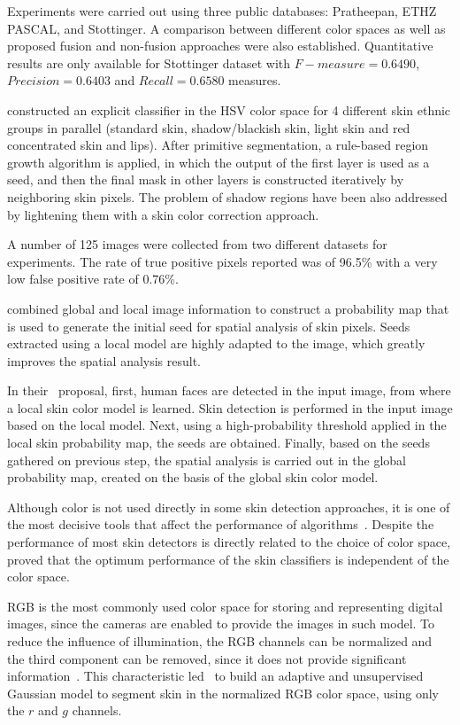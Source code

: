 Experiments were carried out using three public databases: Pratheepan, ETHZ PASCAL, and Stottinger. A comparison between different color spaces as well as proposed fusion and non-fusion approaches were also established. Quantitative results are only available for Stottinger dataset with $F-measure = 0.6490$, $Precision = 0.6403$ and $Recall = 0.6580$ measures.

\citet{naji:12} constructed an explicit classifier in the HSV color space for 4 different skin ethnic groups in parallel (standard skin, shadow/blackish skin, light skin and red concentrated skin and lips). After primitive segmentation, a rule-based region growth algorithm is applied, in which the output of the first layer is used as a seed, and then the final mask in other layers is constructed iteratively by neighboring skin pixels. The problem of shadow regions have been also addressed by lightening them with a skin color correction approach.

A number of 125 images were collected from two different datasets for experiments. The rate of true positive pixels reported was of 96.5\% with a very low false positive rate of 0.76\%.

\citet{kawulok:13} combined global and local image information to construct a probability map that is used to generate the initial seed for spatial analysis of skin pixels. Seeds extracted using a local model are highly adapted to the image, which greatly improves the spatial analysis result.

In their~\citep{kawulok:13} proposal, first, human faces are detected in the input image, from where a local skin color model is learned. Skin detection is performed in the input image based on the local model. Next, using a high-probability threshold applied in the local skin probability map, the seeds are obtained. Finally, based on the seeds gathered on previous step, the spatial analysis is carried out in the global probability map, created on the basis of the global skin color model.

Although color is not used directly in some skin detection approaches, it is one of the most decisive tools that affect the performance of algorithms~\citep{mahmoodi:16}. Despite the performance of most skin detectors is directly related to the choice of color space, \citet{albiol:01} proved that the optimum performance of the skin classifiers is independent of the color space.

RGB is the most commonly used color space for storing and representing digital images, since the cameras are enabled to provide the images in such model. To reduce the influence of illumination, the RGB channels can be normalized and the third component can be removed, since it does not provide significant information~\citep{kakumanu:07}. This characteristic led~\citet{bergasa:00} to build an adaptive and unsupervised Gaussian model to segment skin in the normalized RGB color space, using only the $r$ and $g$ channels.

